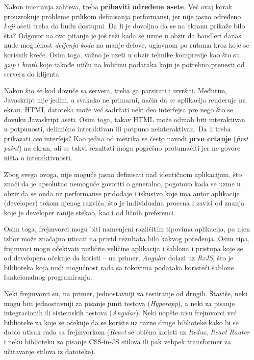 Nakon iniciranja zahteva, treba \textbf{pribaviti određene asete}.
Već ovaj korak prouzrokuje probleme prilikom definisanja performansi, jer nije jasno određeno \emph{koji} aseti treba da budu dostupni.
Da li je dovoljno da se na ekranu prikaže bilo šta?
Odgovor na ovo pitanje je još teži kada se uzme u obzir da bandleri danas nude mogućnost \textit{deljenja koda} na manje delove, uglavnom po rutama kroz koje se korisnik kreće.
Osim toga, važno je uzeti u obzir tehnike kompresije kao što su \textit{gzip} i \textit{brotli} koje takođe utiču na količinu podataka koju je potrebno prenesti od servera do klijenta.

Nakon što se kod dovuče sa servera, treba ga parsirati i izvršiti.
Međutim, Javaskript nije jedini, a svakako ne primarni, način da se aplikacija renderuje na ekran.
HTML datoteka može već sadržati neki deo interfejsa pre nego što se dovuku Javaskript aseti.
Osim toga, takav HTML može odmah biti interaktivan u potpunosti, delimično interaktivan ili potpuno neinteraktivan.
Da li treba prikazati \textit{ceo} interfejs?
Kao jedna od metrika se često navodi \textbf{prvo crtanje} (\textsl{first paint}) na ekran, ali se takvi rezultati mogu pogrešno protumačiti jer ne govore ništa o interaktivnosti.

Zbog svega ovoga, nije moguće jasno definisati  nad identičnom aplikacijom, što znači da je apsolutno nemoguće govoriti o  generalno, pogotovo kada se uzme u obzir da se onda uz performanse pridodaje i iskustvo koje ima autor aplikacije (developer) tokom njenog razvića, što je individualna procena i zavisi od znanja koje je developer ranije stekao, kao i od ličnih preferenci.

Osim toga, frejmvorci mogu biti namenjeni različitim tipovima aplikacija, pa njen izbor može značajno uticati na privid rezultata bilo kakvog poređenja.
Osim tipa, frejmvoci mogu očekivati različite veličine aplikacija i šablona i pristupa koje se od developera očekuje da koristi -- na primer, \textsl{Angular} dolazi uz \textsl{RxJS}, što je biblioteka koja nudi mogućnost rada sa tokovima podataka koristeći šablone funkcionalnog programiranja.

Neki frejmvorci su, na primer, jednostavniji za testiranje od drugih.
Štaviše, neki mogu biti jednostavniji za pisanje junit testova (\textsl{Hyperapp}), a neki za pisanje integracionih ili sistemskih testova (\textsl{Angular}).
Neki  uopšte nisu frejmvorci već biblioteke za koje se očekuje da se koriste uz razne druge biblioteke kako bi se dobio utisak rada sa frejmvorkom (\textsl{React} se obično koristi uz \textsl{Redux}, \textsl{React Router} i neku biblioteku za pisanje CSS-in-JS stilova ili pak vebpek transformer za učitavanje stilova iz  datoteke).

